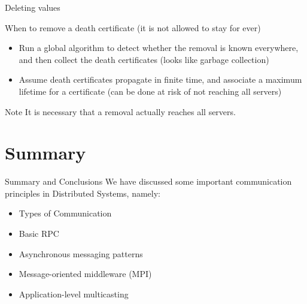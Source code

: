 \begin{slide}{Deleting values}
  \begin{block}{When to remove a death certificate (it is not allowed to stay for ever)}
    \begin{itemize}\tightlist
    \item Run a global algorithm to detect whether the removal is known everywhere, and then collect the death
      certificates (looks like garbage collection)
    \item Assume death certificates propagate in finite time, and associate a maximum lifetime for a
      certificate (can be done at risk of not reaching all servers)
    \end{itemize}
  \end{block}
  \begin{alertblock}{Note} 
    It is necessary that a removal actually reaches all servers.
  \end{alertblock}
\end{slide}
\section{Summary}
\begin{slide}{Summary and Conclusions}
We have discussed some important communication principles
in Distributed Systems, namely:
\begin{itemize}
  \item Types of Communication
  \item Basic RPC
  \item Asynchronous messaging patterns
  \item Message-oriented middleware (MPI)
  \item Application-level multicasting
\end{itemize}  
\end{slide}